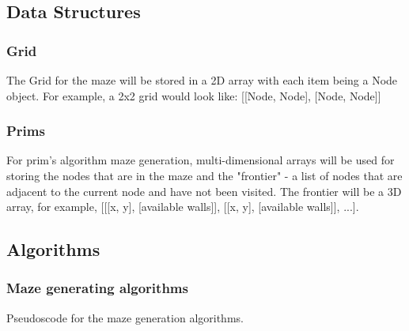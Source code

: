 \documentclass{article}
\begin{document}
\subsection{Data Structures}
\subsubsection{Grid}
The Grid for the maze will be stored in a 2D array with each item being a Node object. For example, a 2x2 grid would look like: [[Node, Node], [Node, Node]]

\subsubsection{Prims}
For prim's algorithm maze generation, multi-dimensional arrays will be used for storing the nodes that are in the maze and the "frontier" -  a list of nodes that are adjacent to the current node and have not been visited. The frontier will be a 3D array, for example, [[[x, y], [available walls]], [[x, y], [available walls]], ...].

\subsection{Algorithms}
\subsubsection{Maze generating algorithms}
Pseudoscode for the maze generation algorithms.
\end{document}
